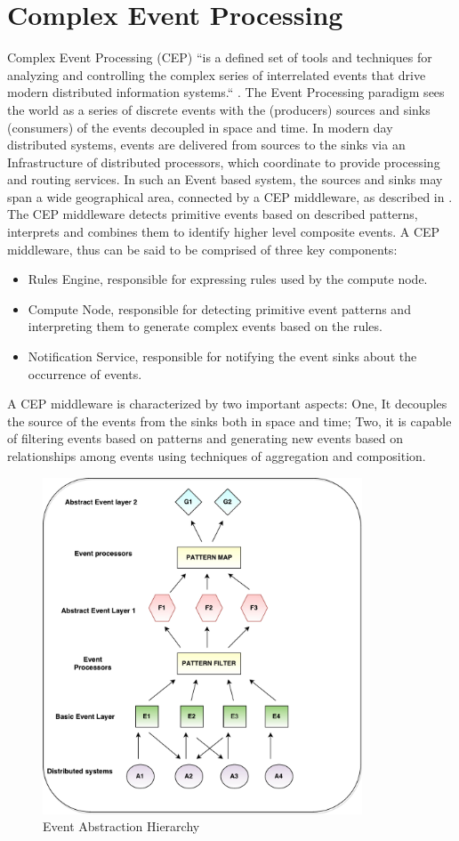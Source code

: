 \section{Complex Event Processing}
Complex Event Processing (CEP) ``is a defined set of tools and techniques for analyzing and controlling the complex series of interrelated events that drive modern distributed information systems.`` \citep{NpForMasses}. The Event Processing paradigm sees the world as a series of discrete events with the (producers) sources and sinks (consumers) of the events decoupled in space and time. In modern day distributed systems, events are delivered from sources to the sinks via an Infrastructure of distributed processors, which coordinate to provide processing and routing services. In such an Event based system, the sources and sinks may span a wide geographical area, connected by a CEP middleware, as described in \cite{Cugola}. The CEP middleware detects primitive events based on described patterns, interprets and combines them to identify higher level composite events. A CEP middleware, thus can be said to be comprised of three key components:
\begin{itemize}
	\item  Rules Engine, responsible for expressing rules used by the compute node.
	\item  Compute Node, responsible for detecting primitive event patterns and interpreting them to generate complex events based on the rules.
	\item Notification Service, responsible for notifying the event sinks about the occurrence of events.
\end{itemize}
A CEP middleware is characterized by two important aspects: One, It decouples the source of the events from the sinks both in space and time; Two, it is capable of filtering events based on patterns and generating new events based on relationships among events using techniques of aggregation and composition. 
\begin{figure}[H]
	\centering
	\caption{Event Abstraction Hierarchy}
	\includegraphics[height=10cm]{Luckham.pdf}
\end{figure}

